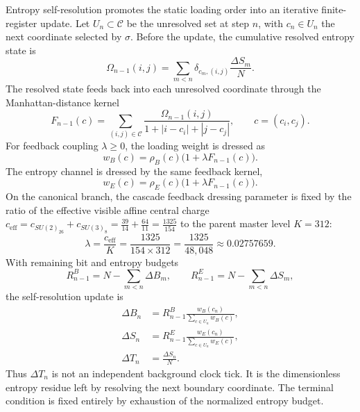 \documentclass[11pt,letterpaper]{article}
\theoremstyle{plain}
\newcommand{\Nbits}{N}
\begin{document}
Entropy self-resolution promotes the static loading order into an iterative
finite-register update.  Let $U_n\subset\mathcal C$ be the unresolved set at
step $n$, with $c_n\in U_n$ the next coordinate selected by $\sigma$.  Before
the update, the cumulative resolved entropy state is
\begin{equation}
\label{eq:section-four-cumulative-entropy-state}
 \Omega_{n-1}(i,j)
 =
 \sum_{m<n}\delta_{c_m,(i,j)}\frac{\Delta S_m}{\Nbits}.
\end{equation}
The resolved state feeds back into each unresolved coordinate through the
Manhattan-distance kernel
\begin{equation}
\label{eq:section-four-feedback-signal}
 F_{n-1}(c)
 =
 \sum_{(i,j)\in\mathcal C}
 \frac{\Omega_{n-1}(i,j)}{1+|i-c_i|+|j-c_j|},
 \qquad
 c=(c_i,c_j).
\end{equation}
For feedback coupling $\lambda\ge0$, the loading weight is dressed as
\begin{equation}
\label{eq:section-four-dressed-loading-weight}
 w_B(c)
 =
 \rho_B(c)\bigl(1+\lambda F_{n-1}(c)\bigr).
\end{equation}
The entropy channel is dressed by the same feedback kernel,
\begin{equation}
\label{eq:section-four-dressed-entanglement-weight}
 w_E(c)
 =
 \rho_E(c)\bigl(1+\lambda F_{n-1}(c)\bigr).
\end{equation}
On the canonical branch, the cascade feedback dressing parameter is fixed by the ratio of the effective visible affine central charge $c_{\text{eff}} = c_{SU(2)_{26}} + c_{SU(3)_8} = \frac{39}{14} + \frac{64}{11} = \frac{1325}{154}$ to the parent master level $K = 312$:
\begin{equation}
\label{eq:section-four-feedback-coupling-value}
 \lambda = \frac{c_{\text{eff}}}{K} = \frac{1325}{154 \times 312} = \frac{1325}{48{,}048} \approx 0.02757659.
\end{equation}
With remaining bit and entropy budgets
\begin{equation}
\label{eq:section-four-remaining-budgets}
 R^B_{n-1}=\Nbits-\sum_{m<n}\Delta B_m,
 \qquad
 R^E_{n-1}=\Nbits-\sum_{m<n}\Delta S_m,
\end{equation}
the self-resolution update is
\begin{align}
\label{eq:section-four-self-resolution-update}
 \Delta B_n
 &=
 R^B_{n-1}
 \frac{w_B(c_n)}{\sum_{c\in U_n}w_B(c)},\nonumber\\
 \Delta S_n
 &=
 R^E_{n-1}
 \frac{w_E(c_n)}{\sum_{c\in U_n}w_E(c)},\\
 \Delta T_n
 &=
 \frac{\Delta S_n}{\Nbits}.
\end{align}
Thus $\Delta T_n$ is not an independent background clock tick.  It is the
dimensionless entropy residue left by resolving the next boundary coordinate.
The terminal condition is fixed entirely by exhaustion of the normalized
entropy budget.
\end{document}
